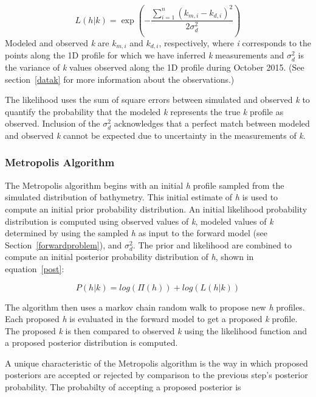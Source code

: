 \begin{equation} \label{likely}
L\left(h|%
k\right)=\exp\left(- \frac{\sum\limits_{i=1}^n({k}_{m,i}-k_{d,i})^2}{2\sigma_{d}^2}\right)
\end{equation} 
Modeled and observed \textit{k} are ${k}_{m,i}$ and $k_{d,i}$, respectively, where \textit{i} corresponds to the points along the 1D profile for which we have inferred \textit{k} measurements and $\sigma_{d}^2$ is the variance of \textit{k} values observed along the 1D profile during October 2015. (See section~\ref{datak} for more information about the observations.) 

The likelihood uses the sum of square errors between simulated and observed \textit{k} to quantify the probability that the modeled \textit{k} represents the true \textit{k} profile as observed. Inclusion of the $\sigma_{d}^2$ acknowledges that a perfect match between modeled and observed \textit{k} cannot be expected due to uncertainty in the measurements of \textit{k}.

\subsubsection{Metropolis Algorithm}
The Metropolis algorithm begins with an initial \textit{h} profile sampled from the simulated distribution of bathymetry. This initial estimate of \textit{h} is used to compute an initial prior probability distribution. An initial likelihood probability distribution is computed using observed values of \textit{k}, modeled values of \textit{k} determined by using the sampled \textit{h} as input to the forward model (see Section~\ref{forwardproblem}), and $\sigma_{d}^2$. The prior and likelihood are combined to compute an initial posterior probability distribution of \textit{h}, shown in equation~\ref{post}:

\begin{equation}\label{post}
P(h|%
k) = log(\Pi(h)) + log(L(h|%
k))
\end{equation}

The algorithm then uses a markov chain random walk to propose new \textit{h} profiles. Each proposed \textit{h} is evaluated in the forward model to get a proposed \textit{k} profile. The proposed \textit{k} is then compared to observed \textit{k} using the likelihood function and a proposed posterior distribution is computed.

A unique characteristic of the Metropolis algorithm is the way in which proposed posteriors are accepted or rejected by comparison to the previous step's posterior probability. The probabilty of accepting a proposed posterior is 

